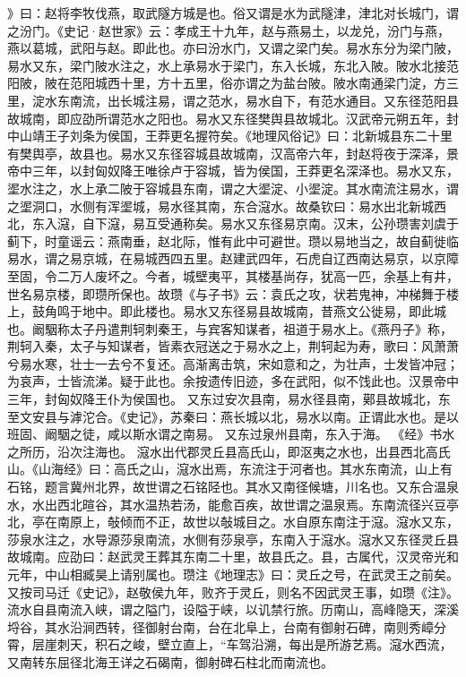 \documentclass[12pt,UTF8]{ctexbook}
\begin{document}
》曰：赵将李牧伐燕，取武隧方城是也。俗又谓是水为武隧津，津北对长城门，谓之汾门。《史记·赵世家》云：孝成王十九年，赵与燕易土，以龙兑，汾门与燕，燕以葛城，武阳与赵。即此也。亦曰汾水门，又谓之梁门矣。易水东分为梁门陂，易水又东，梁门陂水注之，水上承易水于梁门，东入长城，东北入陂。陂水北接范阳陂，陂在范阳城西十里，方十五里，俗亦谓之为盐台陂。陂水南通梁门淀，方三里，淀水东南流，出长城注易，谓之范水，易水自下，有范水通目。又东径范阳县故城南，即应劭所谓范水之阳也。易水又东径樊舆县故城北。汉武帝元朔五年，封中山靖王子刘条为侯国，王莽更名握符矣。《地理风俗记》曰：北新城县东二十里有樊舆亭，故县也。易水又东径容城县故城南，汉高帝六年，封赵将夜于深泽，景帝中三年，以封匈奴降王唯徐卢于容城，皆为侯国，王莽更名深泽也。易水又东，埿水注之，水上承二陂于容城县东南，谓之大埿淀、小埿淀。其水南流注易水，谓之埿洞口，水侧有浑埿城，易水径其南，东合滱水。故桑钦曰：易水出北新城西北，东入滱，自下滱，易互受通称矣。易水又东径易京南。汉末，公孙瓒害刘虞于蓟下，时童谣云：燕南垂，赵北际，惟有此中可避世。瓒以易地当之，故自蓟徙临易水，谓之易京城，在易城西四五里。赵建武四年，石虎自辽西南达易京，以京障至固，令二万人废坏之。今者，城壁夷平，其楼基尚存，犹高一匹，余基上有井，世名易京楼，即瓒所保也。故瓒《与子书》云：袁氏之攻，状若鬼神，冲梯舞于楼上，鼓角鸣于地中。即此楼也。易水又东径易县故城南，昔燕文公徙易，即此城也。阚駰称太子丹遣荆轲刺秦王，与宾客知谋者，祖道于易水上。《燕丹子》称，荆轲入秦，太子与知谋者，皆素衣冠送之于易水之上，荆轲起为寿，歌曰：风萧萧兮易水寒，壮士一去兮不复还。高渐离击筑，宋如意和之，为壮声，士发皆冲冠；为哀声，士皆流涕。疑于此也。余按遗传旧迹，多在武阳，似不饯此也。汉景帝中三年，封匈奴降王仆为侯国也。
又东过安次县南，易水径县南，鄚县故城北，东至文安县与滹沱合。《史记》，苏秦曰：燕长城以北，易水以南。正谓此水也。是以班固、阚駰之徒，咸以斯水谓之南易。
又东过泉州县南，东入于海。
《经》书水之所历，沿次注海也。
滱水出代郡灵丘县高氏山，即沤夷之水也，出县西北高氏山。《山海经》曰：高氏之山，滱水出焉，东流注于河者也。其水东南流，山上有石铭，题言冀州北界，故世谓之石铭陉也。其水又南径候塘，川名也。又东合温泉水，水出西北暄谷，其水温热若汤，能愈百疾，故世谓之温泉焉。东南流径兴豆亭北，亭在南原上，敧倾而不正，故世以敧城目之。水自原东南注于滱。滱水又东，莎泉水注之，水导源莎泉南流，水侧有莎泉亭，东南入于滱水。滱水又东径灵丘县故城南。应劭曰：赵武灵王葬其东南二十里，故县氏之。县，古属代，汉灵帝光和元年，中山相臧昊上请别属也。瓒注《地理志》曰：灵丘之号，在武灵王之前矣。又按司马迁《史记》，赵敬侯九年，败齐于灵丘，则名不因武灵王事，如瓒《注》。流水自县南流入峡，谓之隘门，设隘于峡，以讥禁行旅。历南山，高峰隐天，深溪埒谷，其水沿涧西转，径御射台南，台在北阜上，台南有御射石碑，南则秀嶂分霄，层崖刺天，积石之峻，壁立直上，“车驾沿溯，每出是所游艺焉。滱水西流，又南转东屈径北海王详之石碣南，御射碑石柱北而南流也。
\end{document}
